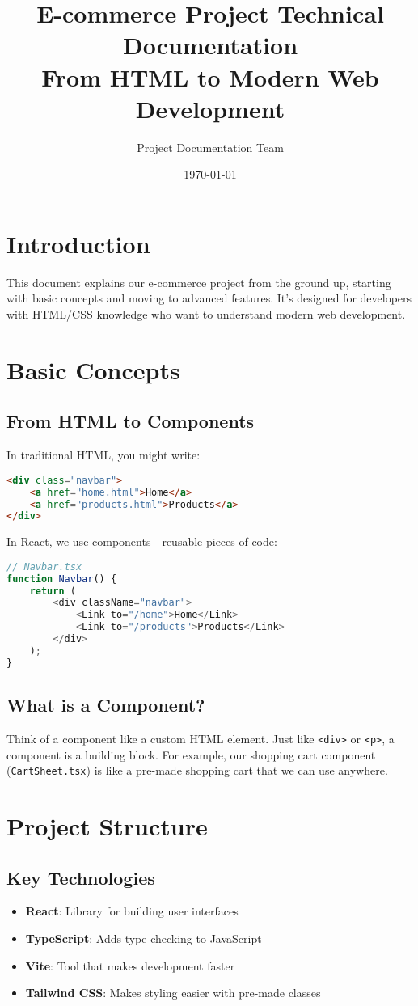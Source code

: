 \documentclass{article}
\title{E-commerce Project Technical Documentation\\
\large From HTML to Modern Web Development}
\author{Project Documentation Team}
\date{\today}
\begin{document}
\maketitle
\tableofcontents
\newpage

\section{Introduction}
This document explains our e-commerce project from the ground up, starting with basic concepts and moving to advanced features. It's designed for developers with HTML/CSS knowledge who want to understand modern web development.

\section{Basic Concepts}
\subsection{From HTML to Components}
In traditional HTML, you might write:
\begin{lstlisting}[language=HTML]
<div class="navbar">
    <a href="home.html">Home</a>
    <a href="products.html">Products</a>
</div>
\end{lstlisting}

In React, we use components - reusable pieces of code:
\begin{lstlisting}[language=JavaScript]
// Navbar.tsx
function Navbar() {
    return (
        <div className="navbar">
            <Link to="/home">Home</Link>
            <Link to="/products">Products</Link>
        </div>
    );
}
\end{lstlisting}

\subsection{What is a Component?}
Think of a component like a custom HTML element. Just like \texttt{<div>} or \texttt{<p>}, a component is a building block. For example, our shopping cart component (\texttt{CartSheet.tsx}) is like a pre-made shopping cart that we can use anywhere.

\section{Project Structure}
\subsection{Key Technologies}
\begin{itemize}
    \item \textbf{React}: Library for building user interfaces
    \item \textbf{TypeScript}: Adds type checking to JavaScript
    \item \textbf{Vite}: Tool that makes development faster
    \item \textbf{Tailwind CSS}: Makes styling easier with pre-made classes
\end{itemize}
\end{document}
